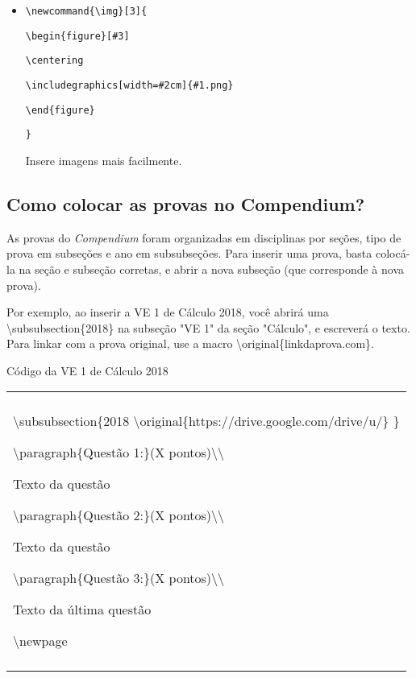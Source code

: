 \documentclass[12pt,a4paper]{article}
\newenvironment{caixa}[1]
    {\begin{center}
    #1\\[1ex]
    \begin{tabular}{|p{0.9\textwidth}|}
    \hline\\
    }
    { 
    \\\\\hline
    \end{tabular} 
    \end{center}
    }
\begin{document}
\begin{itemize}
\item \texttt{\textbackslash newcommand\{\textbackslash img\}[3]\{}

\texttt{\textbackslash begin\{figure\}[\#3]}

\texttt{\textbackslash centering}

\texttt{\textbackslash includegraphics[width=\#2cm]\{\#1.png\}}

\texttt{\textbackslash end\{figure\}}

\texttt{\}}

Insere imagens mais facilmente.

\end{itemize}



\newpage

\subsection{Como colocar as provas no Compendium?}

As provas do \textit{Compendium} foram organizadas em disciplinas por seções, tipo de prova em subseções e ano em subsubseções. Para inserir uma prova, basta colocá-la na seção e subseção corretas, e abrir a nova subseção (que corresponde à nova prova).

Por exemplo, ao inserir a VE 1 de Cálculo 2018, você abrirá uma \textbackslash subsubsection\{2018\} na subseção "VE 1" da seção "Cálculo", e escreverá o texto. Para linkar com a prova original, use a macro \textbackslash original\{linkdaprova.com\}.

\begin{caixa}{Código da VE 1 de Cálculo 2018}
{\textbackslash subsubsection\{2018 \textbackslash original\{https://drive.google.com/drive/u/\} \}



\textbackslash paragraph\{Questão 1:\}(X pontos)\textbackslash\textbackslash

Texto da questão

\textbackslash paragraph\{Questão 2:\}(X pontos)\textbackslash\textbackslash

Texto da questão

\textbackslash paragraph\{Questão 3:\}(X pontos)\textbackslash\textbackslash

Texto da última questão

\textbackslash newpage}

\end{caixa}
\end{document}

